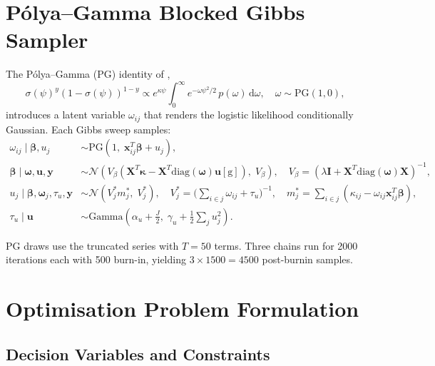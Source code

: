 \documentclass[11pt,a4paper]{article}
\newcommand{\sigmoid}{\sigma}
\begin{document}
\section{P\'{o}lya--Gamma Blocked Gibbs Sampler}

The P\'{o}lya--Gamma (PG) identity of \textcite{Polson2013},
\begin{equation}
  \sigmoid(\psi)^{y}(1-\sigmoid(\psi))^{1-y}
  \propto e^{\kappa\psi}
    \int_0^\infty e^{-\omega\psi^2/2}\,p(\omega)\,\mathrm{d}\omega,
  \quad \omega \sim \mathrm{PG}(1,0),
\end{equation}
introduces a latent variable $\omega_{ij}$ that renders the logistic likelihood
conditionally Gaussian.
Each Gibbs sweep samples:
\begin{align}
  \omega_{ij} \mid \bm{\beta}, u_j
    &\sim \mathrm{PG}(1,\; \mathbf{x}_{ij}^T\bm{\beta} + u_j), \label{eq:pg_omega}\\
  \bm{\beta} \mid \bm{\omega}, \mathbf{u}, \mathbf{y}
    &\sim \mathcal{N}(V_\beta(\bm{X}^T\bm{\kappa} - \bm{X}^T\mathrm{diag}(\bm{\omega})\mathbf{u}[\mathrm{g}]),\;V_\beta),
    \quad V_\beta = (\lambda\bm{I} + \bm{X}^T\mathrm{diag}(\bm{\omega})\bm{X})^{-1},\\
  u_j \mid \bm{\beta}, \bm{\omega}_j, \tau_u, \mathbf{y}
    &\sim \mathcal{N}(V_j^*m_j^*,\; V_j^*),
    \quad V_j^* = \bigl(\textstyle\sum_{i\in j}\omega_{ij} + \tau_u\bigr)^{-1},
    \quad m_j^* = \textstyle\sum_{i\in j}(\kappa_{ij} - \omega_{ij}\mathbf{x}_{ij}^T\bm{\beta}),\\
  \tau_u \mid \mathbf{u}
    &\sim \mathrm{Gamma}\!\left(\alpha_u + \tfrac{J}{2},\;
      \gamma_u + \tfrac{1}{2}\textstyle\sum_j u_j^2\right).
\end{align}

PG draws use the truncated series with $T=50$ terms.
Three chains run for 2000 iterations each with 500 burn-in, yielding
$3 \times 1500 = 4500$ post-burnin samples.

\section{Optimisation Problem Formulation}

\subsection*{Decision Variables and Constraints}
\end{document}
